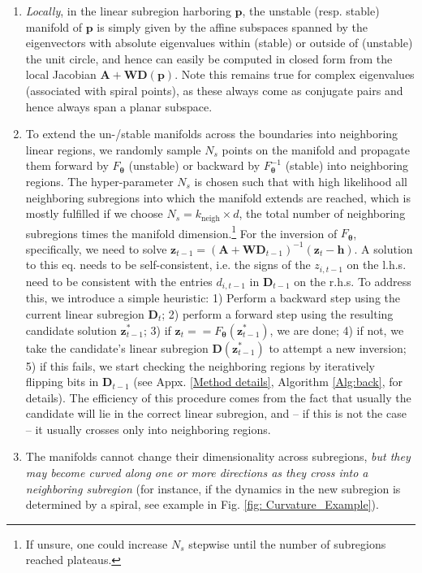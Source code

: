 \documentclass{article}
\theoremstyle{example}
\theoremstyle{plain}
\theoremstyle{definition}
\theoremstyle{remark}
\def\vh{{\bm{h}}}
\def\vp{{\bm{p}}}
\def\vz{{\bm{z}}}
\def\mA{{\bm{A}}}
\def\mD{{\bm{D}}}
\def\mW{{\bm{W}}}
\begin{document}
\begin{enumerate}[leftmargin=12pt] %
    \item \textit{Locally}, in the linear subregion harboring $\bm{p}$, the unstable (resp. stable) manifold of $\vp$ is simply given by the affine subspaces spanned by the eigenvectors with absolute eigenvalues within (stable) or outside of (unstable) the unit circle, and hence can easily be computed in closed form from the local Jacobian $\mA + \mW\mD(\vp)$. Note this remains true for complex eigenvalues (associated with spiral points), as these always come as conjugate pairs and hence always span a planar subspace. 
    \item To extend the un-/stable manifolds across the boundaries into neighboring linear regions, we randomly sample $N_s$ points on the manifold and propagate them forward by $F_{\mathbf{\theta}}$ (unstable) or backward by $F^{-1}_{\mathbf{\theta}}$ (stable) into neighboring regions. The hyper-parameter $N_s$ is chosen such that with high likelihood all neighboring subregions into which the manifold extends are reached, which is mostly fulfilled if we choose $N_s=k_{\text{neigh}} \times d$, the total number of neighboring subregions times the manifold dimension.\footnote{If unsure, one could increase $N_s$ stepwise until the number of subregions reached plateaus.} For the inversion of $F_{\mathbf{\theta}}$, specifically, we need to solve $\vz_{t-1} = (\mA + \mW\mD_{t-1})^{-1}(\vz_t - \vh)$. A solution to this eq. needs to be self-consistent, i.e. the signs of the $z_{i,t-1}$ on the l.h.s. need to be consistent with the entries $d_{i,t-1}$ in $\mD_{t-1}$ on the r.h.s. To address this, we introduce a simple heuristic: 1) Perform a backward step using the current linear subregion $\mD_{t}$; 2) perform a forward step using the resulting candidate solution \( \vz^*_{t-1} \); 3) if \( \vz_t==F_{\mathbf{\theta}}(\vz^*_{t-1}) \), we are done; 4) if not, we take the candidate's linear subregion $\mD(\vz^*_{t-1})$ to attempt a new inversion; 5) if this fails, we start checking the neighboring regions by iteratively flipping bits in $\mD_{t-1}$ (see Appx. \ref{Method details}, Algorithm \ref{Alg:back}, for details). 
    The efficiency of this procedure comes from the fact that usually the candidate will lie in the correct linear subregion, and -- if this is not the case -- it usually crosses only into neighboring regions.
    \item The manifolds cannot change their dimensionality across subregions, \textit{but they may become curved along one or more directions as they cross into a neighboring subregion} (for instance, if the dynamics in the new subregion is determined by a spiral, see example in Fig. \ref{fig: Curvature_Example}). 

\end{enumerate}
\end{document}

